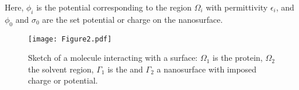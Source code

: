 \noindent Here, $\phi_i$ is the potential corresponding to the region $\Omega_i$ with permittivity $\epsilon_i$, and $\phi_0$ and $\sigma_0$ are the set potential or charge on the nanosurface. 

\begin{figure}
   \texttt{[image: Figure2.pdf]} 
   \caption{Sketch of a molecule interacting with a surface: $\Omega_1$ is the protein, $\Omega_2$ the solvent region, $\Gamma_1$ is the  \ses and $\Gamma_2$ a nanosurface with imposed charge or potential.}
   \label{fig:molecule_surface}
\end{figure}
